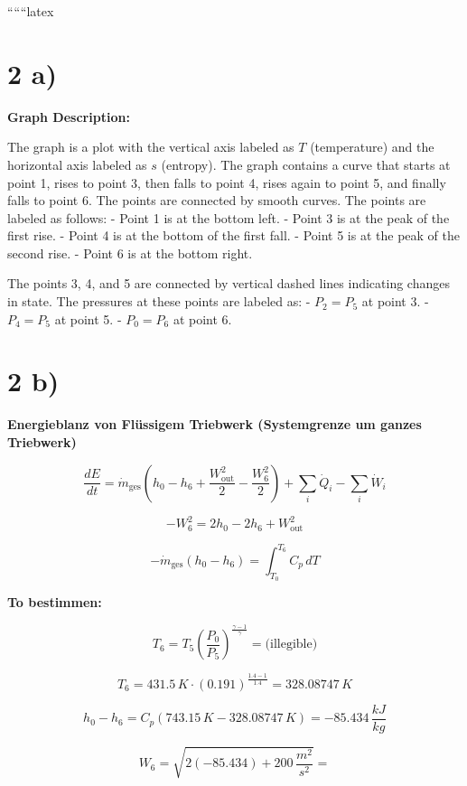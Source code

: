 
``````latex


\section*{2 a)}

\begin{center}
\textbf{Graph Description:}
\end{center}

The graph is a plot with the vertical axis labeled as $T$ (temperature) and the horizontal axis labeled as $s$ (entropy). The graph contains a curve that starts at point 1, rises to point 3, then falls to point 4, rises again to point 5, and finally falls to point 6. The points are connected by smooth curves. The points are labeled as follows:
- Point 1 is at the bottom left.
- Point 3 is at the peak of the first rise.
- Point 4 is at the bottom of the first fall.
- Point 5 is at the peak of the second rise.
- Point 6 is at the bottom right.

The points 3, 4, and 5 are connected by vertical dashed lines indicating changes in state. The pressures at these points are labeled as:
- $P_2 = P_5$ at point 3.
- $P_4 = P_5$ at point 5.
- $P_0 = P_6$ at point 6.

\section*{2 b)}

\textbf{Energieblanz von Fl\"ussigem Triebwerk (Systemgrenze um ganzes Triebwerk)}

\[
\frac{dE}{dt} = \dot{m}_\text{ges} \left( h_0 - h_6 + \frac{W_\text{out}^2}{2} - \frac{W_6^2}{2} \right) + \sum_i \dot{Q}_i - \sum_i \dot{W}_i
\]

\[
- W_6^2 = 2 h_0 - 2 h_6 + W_\text{out}^2
\]

\[
- \dot{m}_\text{ges} \left( h_0 - h_6 \right) = \int_{T_0}^{T_6} C_p \, dT
\]

\textbf{To bestimmen:}

\[
T_6 = T_5 \left( \frac{P_0}{P_5} \right)^{\frac{\gamma - 1}{\gamma}} = \text{(illegible)}
\]

\[
T_6 = 431.5 \, K \cdot \left( 0.191 \right)^{\frac{1.4 - 1}{1.4}} = 328.08747 \, K
\]

\[
h_0 - h_6 = C_p \left( 743.15 \, K - 328.08747 \, K \right) = -85.434 \, \frac{kJ}{kg}
\]

\[
W_6 = \sqrt{2 \left( -85.434 \right) + 200 \, \frac{m^2}{s^2}} = 
\]

